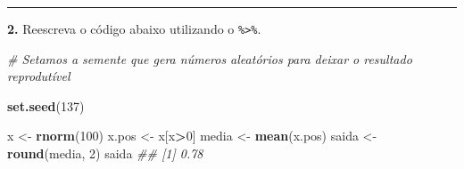 \documentclass[]{book}
\newenvironment{Shaded}{\begin{snugshade}}{\end{snugshade}}
\newcommand{\CommentTok}[1]{\textcolor[rgb]{0.56,0.35,0.01}{\textit{#1}}}
\newcommand{\DataTypeTok}[1]{\textcolor[rgb]{0.13,0.29,0.53}{#1}}
\newcommand{\DecValTok}[1]{\textcolor[rgb]{0.00,0.00,0.81}{#1}}
\newcommand{\KeywordTok}[1]{\textcolor[rgb]{0.13,0.29,0.53}{\textbf{#1}}}
\newcommand{\NormalTok}[1]{#1}
\newcommand{\OperatorTok}[1]{\textcolor[rgb]{0.81,0.36,0.00}{\textbf{#1}}}
\newcommand{\StringTok}[1]{\textcolor[rgb]{0.31,0.60,0.02}{#1}}
\begin{document}
\begin{Shaded}
\end{Shaded}

\begin{center}\rule{0.5\linewidth}{0.5pt}\end{center}

\textbf{2.} Reescreva o código abaixo utilizando o \texttt{\%\textgreater{}\%}.

\begin{Shaded}
\begin{Highlighting}[]
\CommentTok{# Setamos a semente que gera números aleatórios para deixar o resultado reprodutível}

\KeywordTok{set.seed}\NormalTok{(}\DecValTok{137}\NormalTok{)}

\NormalTok{x <-}\StringTok{ }\KeywordTok{rnorm}\NormalTok{(}\DecValTok{100}\NormalTok{)}
\NormalTok{x.pos <-}\StringTok{ }\NormalTok{x[x}\OperatorTok{>}\DecValTok{0}\NormalTok{]}
\NormalTok{media <-}\StringTok{ }\KeywordTok{mean}\NormalTok{(x.pos)}
\NormalTok{saida <-}\StringTok{ }\KeywordTok{round}\NormalTok{(media, }\DecValTok{2}\NormalTok{)}
\NormalTok{saida}
\CommentTok{## [1] 0.78}
\end{Highlighting}
\end{Shaded}

\begin{Shaded}
\end{Shaded}
\end{document}
